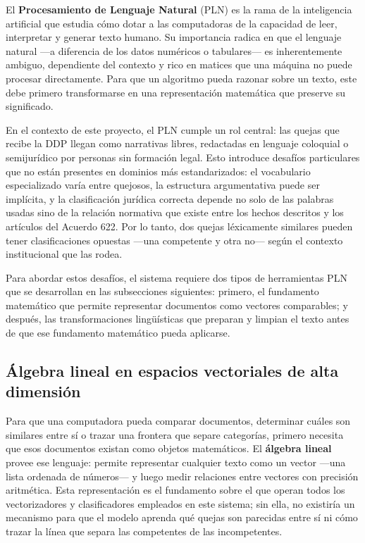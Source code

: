 El \textbf{Procesamiento de Lenguaje Natural} (PLN) es la rama de la
inteligencia artificial que estudia cómo dotar a las computadoras de la capacidad
de leer, interpretar y generar texto humano. Su importancia radica en que el
lenguaje natural —a diferencia de los datos numéricos o tabulares— es inherentemente
ambiguo, dependiente del contexto y rico en matices que una máquina no puede
procesar directamente. \cite{jurafsky2023} Para que un algoritmo pueda razonar sobre un texto, este
debe primero transformarse en una representación matemática que preserve su
significado.

En el contexto de este proyecto, el PLN cumple un rol central: las quejas que
recibe la DDP llegan como narrativas libres, redactadas en lenguaje coloquial o
semijurídico por personas sin formación legal. Esto introduce desafíos
particulares que no están presentes en dominios más estandarizados: el
vocabulario especializado varía entre quejosos, la estructura argumentativa puede
ser implícita, y la clasificación jurídica correcta depende no solo de las
palabras usadas sino de la relación normativa que existe entre los hechos
descritos y los artículos del Acuerdo 622. Por lo tanto, dos quejas léxicamente
similares pueden tener clasificaciones opuestas —una competente y otra no— según
el contexto institucional que las rodea.

Para abordar estos desafíos, el sistema requiere dos tipos de herramientas PLN
que se desarrollan en las subsecciones siguientes: primero, el fundamento
matemático que permite representar documentos como vectores comparables; y
después, las transformaciones lingüísticas que preparan y limpian el texto antes
de que ese fundamento matemático pueda aplicarse.

\subsection{Álgebra lineal en espacios vectoriales de alta dimensión}

Para que una computadora pueda comparar documentos, determinar cuáles son
similares entre sí o trazar una frontera que separe categorías, primero necesita
que esos documentos existan como objetos matemáticos. El \textbf{álgebra lineal}
provee ese lenguaje: permite representar cualquier texto como un vector —una
lista ordenada de números— y luego medir relaciones entre vectores con precisión
aritmética. Esta representación es el fundamento sobre el que operan todos los
vectorizadores y clasificadores empleados en este sistema; sin ella, no existiría
un mecanismo para que el modelo aprenda qué quejas son parecidas entre sí ni cómo
trazar la línea que separa las competentes de las incompetentes.

